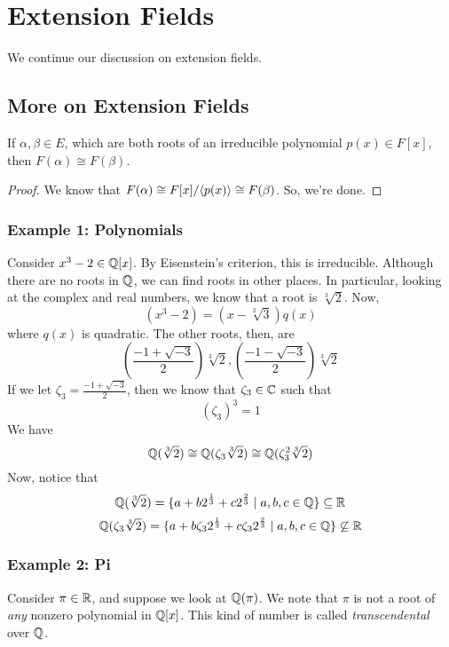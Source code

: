 \documentclass[letterpaper]{article}
\begin{document}
\section{Extension Fields}
We continue our discussion on extension fields. 


\subsection{More on Extension Fields}
\begin{corollary}{}{}
    If $\alpha, \beta \in E$, which are both roots of an irreducible polynomial $p(x) \in F[x]$, then $F(\alpha) \cong F(\beta)$. 
\end{corollary}

\begin{mdframed}[]
    \begin{proof}
        We know that $F(\alpha) \cong F[x] / \langle p(x) \rangle \cong F(\beta)$. So, we're done. 
    \end{proof}
\end{mdframed}

\subsubsection{Example 1: Polynomials}
Consider $x^3 - 2 \in \mathbb{Q}[x]$. By Eisenstein's criterion, this is irreducible. Although there are no roots in $\mathbb{Q}$, we can find roots in other places. In particular, looking at the complex and real numbers, we know that a root is $\sqrt[3]{2}$. Now, 
\[(x^3 - 2) = (x - \sqrt[2]{3})q(x)\]
where $q(x)$ is quadratic. The other roots, then, are 
\[\left(\frac{-1 + \sqrt{-3}}{2}\right) \sqrt[3]{2}, \left(\frac{-1 - \sqrt{-3}}{2}\right) \sqrt[3]{2}\]
If we let $\zeta_3 = \frac{-1 + \sqrt{-3}}{2}$, then we know that $\zeta_3 \in \mathbb{C}$ such that 
\[(\zeta_3)^3 = 1\]
We have 
\[\mathbb{Q}(\sqrt[3]{2}) \cong \mathbb{Q}(\zeta_3 \sqrt[3]{2}) \cong \mathbb{Q}(\zeta_{3}^2 \sqrt[3]{2})\]
Now, notice that  
\[\mathbb{Q}(\sqrt[3]{2}) = \{a + b 2^{\frac{1}{3}} + c2^{\frac{2}{3}} \mid a, b, c \in \mathbb{Q}\} \subseteq \mathbb{R}\]
\[\mathbb{Q}(\zeta_3 \sqrt[3]{2}) = \{a + b \zeta_3 2^{\frac{1}{3}} + c \zeta_3 2^{\frac{2}{3}} \mid a, b, c \in \mathbb{Q}\} \not\subseteq \mathbb{R}\]

\subsubsection{Example 2: Pi}
Consider $\pi \in \mathbb{R}$, and suppose we look at $\mathbb{Q}(\pi)$. We note that $\pi$ is not a root of \emph{any} nonzero polynomial in $\mathbb{Q}[x]$. This kind of number is called \emph{transcendental} over $\mathbb{Q}$.
\end{document}
